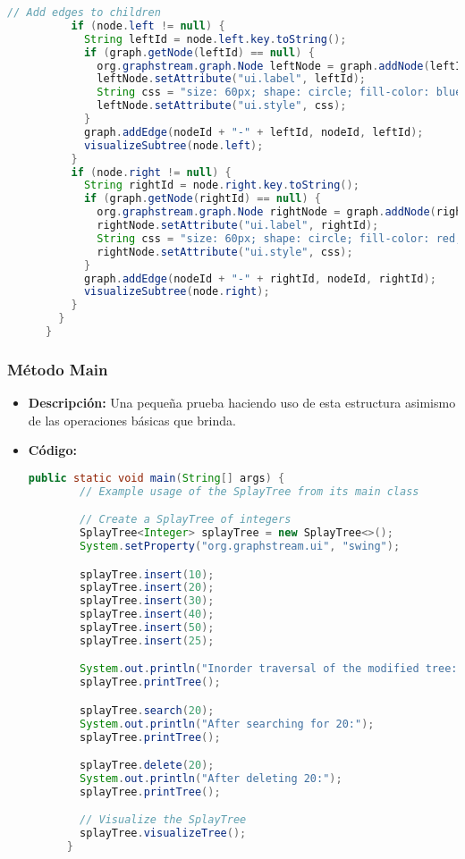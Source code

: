 \documentclass{article}
\begin{document}
\begin{itemize}
\begin{lstlisting}[language=Java, caption={Método visualizeSubtree}]
          // Add edges to children
          if (node.left != null) {
            String leftId = node.left.key.toString();
            if (graph.getNode(leftId) == null) {
              org.graphstream.graph.Node leftNode = graph.addNode(leftId);
              leftNode.setAttribute("ui.label", leftId);
              String css = "size: 60px; shape: circle; fill-color: blue; text-color: black; text-size: 40px;";
              leftNode.setAttribute("ui.style", css);
            }
            graph.addEdge(nodeId + "-" + leftId, nodeId, leftId);
            visualizeSubtree(node.left);
          }
          if (node.right != null) {
            String rightId = node.right.key.toString();
            if (graph.getNode(rightId) == null) {
              org.graphstream.graph.Node rightNode = graph.addNode(rightId);
              rightNode.setAttribute("ui.label", rightId);
              String css = "size: 60px; shape: circle; fill-color: red; text-color: black; text-size: 40px;";
              rightNode.setAttribute("ui.style", css);
            }
            graph.addEdge(nodeId + "-" + rightId, nodeId, rightId);
            visualizeSubtree(node.right);
          }
        }
      }
    \end{lstlisting}
  \end{itemize}
  

  \subsubsection{Método Main}
  \begin{itemize}
    \item \textbf{Descripción: }Una pequeña prueba haciendo uso de esta estructura asimismo de las operaciones básicas que brinda.
    \item \textbf{Código: }
    \begin{lstlisting}[language=Java, caption={Método Main}]
      public static void main(String[] args) {
        // Example usage of the SplayTree from its main class

        // Create a SplayTree of integers
        SplayTree<Integer> splayTree = new SplayTree<>();
        System.setProperty("org.graphstream.ui", "swing");

        splayTree.insert(10);
        splayTree.insert(20);
        splayTree.insert(30);
        splayTree.insert(40);
        splayTree.insert(50);
        splayTree.insert(25);

        System.out.println("Inorder traversal of the modified tree:");
        splayTree.printTree();

        splayTree.search(20);
        System.out.println("After searching for 20:");
        splayTree.printTree();

        splayTree.delete(20);
        System.out.println("After deleting 20:");
        splayTree.printTree();

        // Visualize the SplayTree
        splayTree.visualizeTree();
      }
    \end{lstlisting}
  \end{itemize}
\end{document}
